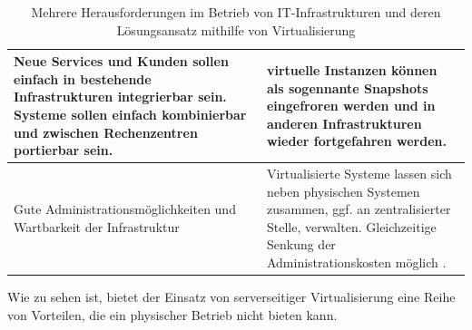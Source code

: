 \documentclass[../main.tex]{subfiles}
\begin{document}
\begin{table}[htp]
\begin{centering}
\begin{tabularx}{\textwidth}{>{\hsize=1\hsize}X>{\hsize=1\hsize}X}
				\hline
				Neue Services und Kunden sollen einfach in bestehende Infrastrukturen integrierbar sein. Systeme sollen einfach kombinierbar und zwischen Rechenzentren portierbar sein.
				& virtuelle Instanzen können als sogennante Snapshots \glqq{}eingefroren\grqq{} werden und in anderen Infrastrukturen wieder fortgefahren werden.\\
			  \hline
				Gute Administrationsmöglichkeiten und Wartbarkeit der Infrastruktur
				& Virtualisierte Systeme lassen sich neben physischen Systemen zusammen, ggf. an zentralisierter Stelle, verwalten. Gleichzeitige Senkung der Administrationskosten möglich \cite[S.1]{bsiVirt}.
		  \end{tabularx}
			\caption{Mehrere Herausforderungen im Betrieb von IT-Infrastrukturen und deren Lösungsansatz mithilfe von Virtualisierung}
			\end{centering}
			\label{tab:virtAdvantages}
		\end{table}

		Wie zu sehen ist, bietet der Einsatz von serverseitiger Virtualisierung eine Reihe von Vorteilen, die ein physischer Betrieb nicht bieten kann.



\end{document}
